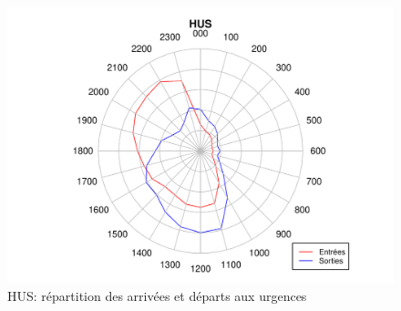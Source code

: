 \documentclass[12pt,english,french,twoside]{report}\usepackage[]{graphicx}\usepackage[]{color}
\makeatletter
\def\maxwidth{ %
  \ifdim\Gin@nat@width>\linewidth
    \linewidth
  \else
    \Gin@nat@width
  \fi
}
\newenvironment{knitrout}{}{} %
\makeatother
\begin{document}
\begin{figure}
\begin{center}
\begin{knitrout}
\color{fgcolor}
\includegraphics[width=\maxwidth]{figure/test2} 

\end{knitrout}

\end{center}
\caption{HUS: répartition des arrivées et départs aux urgences}
\label{passage:hus}
\end{figure}
\end{document}
